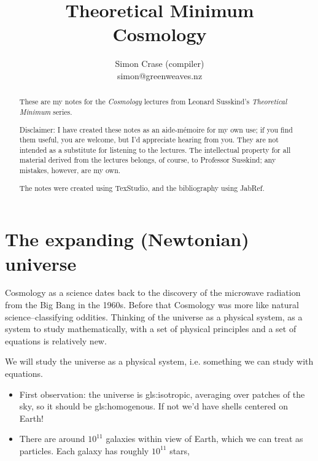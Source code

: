 \documentclass[]{article}
\title{Theoretical Minimum\\Cosmology}
\author{Simon Crase (compiler)\\simon@greenweaves.nz}
\begin{document}
\maketitle

\begin{abstract}
	These are my notes for the \emph{Cosmology}\cite{susskind2013cosmology} lectures from Leonard Susskind's \emph{Theoretical Minimum} series\cite{susskind2007theoretical}. 
	
	Disclaimer: I have created these notes as an aide-m\'emoire for my own use; if you find them useful, you are welcome, but I'd appreciate hearing from you. They are not intended 
	as a substitute for listening to the lectures. The intellectual property for all material derived from the lectures belongs, of course, to Professor Susskind; any mistakes, however, are my own.
	
	The notes were created using TexStudio\cite{TexStudio}, and the bibliography using JabRef\cite{Jabref}.
\end{abstract}

\tableofcontents
\listoffigures
\listoftables
\listoftheorems


		
\section{The expanding (Newtonian) universe}

Cosmology as a science dates back to the discovery of the microwave radiation from the Big Bang in the 1960s. Before that Cosmology was more like natural science--classifying oddities. Thinking of the universe as a physical system, as a system to study mathematically, with a set of physical principles and a set of equations is relatively new.

We will study the universe as a physical system, i.e. something we can study with equations.

\begin{itemize}
	\item First observation: the universe is \gls{gls:isotropic}, averaging over patches of the sky, so it should be \gls{gls:homogenous}. If not we'd have shells centered on Earth!

	\item There are around $10^{11}$ galaxies within view of Earth, which we can treat as particles. Each galaxy has roughly $10^{11}$ stars,
\end{itemize}
\end{document}

